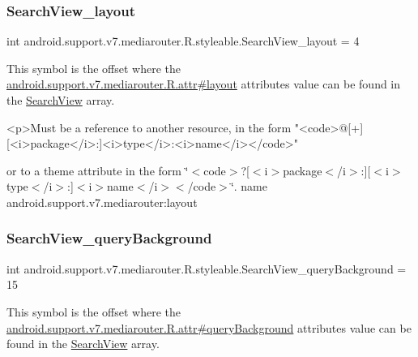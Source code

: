 \subsubsection{\texorpdfstring{Search\+View\+\_\+layout}{SearchView\_layout}}
{\footnotesize\ttfamily int android.\+support.\+v7.\+mediarouter.\+R.\+styleable.\+Search\+View\+\_\+layout = 4\hspace{0.3cm}{\ttfamily [static]}}

This symbol is the offset where the \hyperlink{classandroid_1_1support_1_1v7_1_1mediarouter_1_1R_1_1attr_a7936d1b6f472a1418ca17e8942f5f989}{android.\+support.\+v7.\+mediarouter.\+R.\+attr\#layout} attribute\textquotesingle{}s value can be found in the \hyperlink{classandroid_1_1support_1_1v7_1_1mediarouter_1_1R_1_1styleable_a5573e3195bf93122a37c69394418c7d7}{Search\+View} array.

\begin{DoxyVerb}      <p>Must be a reference to another resource, in the form "<code>@[+][<i>package</i>:]<i>type</i>:<i>name</i></code>"
\end{DoxyVerb}
 or to a theme attribute in the form \char`\"{}$<$code$>$?\mbox{[}$<$i$>$package$<$/i$>$\+:\mbox{]}\mbox{[}$<$i$>$type$<$/i$>$\+:\mbox{]}$<$i$>$name$<$/i$>$$<$/code$>$\char`\"{}.  name android.\+support.\+v7.\+mediarouter\+:layout \mbox{\label{classandroid_1_1support_1_1v7_1_1mediarouter_1_1R_1_1styleable_a3ac6b81bd921b428110700ffe00dfa9f}} 
\subsubsection{\texorpdfstring{Search\+View\+\_\+query\+Background}{SearchView\_queryBackground}}
{\footnotesize\ttfamily int android.\+support.\+v7.\+mediarouter.\+R.\+styleable.\+Search\+View\+\_\+query\+Background = 15\hspace{0.3cm}{\ttfamily [static]}}

This symbol is the offset where the \hyperlink{classandroid_1_1support_1_1v7_1_1mediarouter_1_1R_1_1attr_aef2a1d8758be769981a6f328628b5353}{android.\+support.\+v7.\+mediarouter.\+R.\+attr\#query\+Background} attribute\textquotesingle{}s value can be found in the \hyperlink{classandroid_1_1support_1_1v7_1_1mediarouter_1_1R_1_1styleable_a5573e3195bf93122a37c69394418c7d7}{Search\+View} array.


